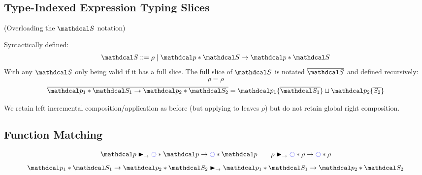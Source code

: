 \subsection{Type-Indexed Expression Typing Slices}
(Overloading the $\S$ notation)
\begin{definition}
Syntactically defined: 
\[\S ::= \rho \mid \p * \S \to \p * \S\] 
With any $\S$ only being valid if it has a full slice. The full slice of $\S$ is notated $\overline{\S}$ and defined recursively:
\[\overline{\rho} = \rho\]
\[\overline{\p_1 * \S_1 \to \p_2 * \S_2} = \p_1 \{ \overline{\S_1}\} \sqcup \p_2 \{ \overline{S_2}\}\]
\end{definition}
We retain left incremental composition/application as before (but applying to leaves $\rho$) but do not retain global right composition.
\subsection{Function Matching}
\begin{definition}
\[\p \funmatch \cmark * \p \to \cmark * \p \qquad \rho \funmatch \cmark * \rho \to \cmark * \rho\]
\[\p_1 * \S_1 \to \p_2 * \S_2 \funmatch \p_1 * \S_1 \to \p_2 * \S_2\]
\end{definition}
 
